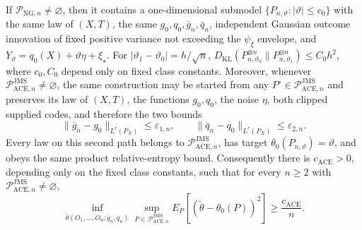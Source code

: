 If \(\mathcal P_{\mathrm{NG},n}\neq\varnothing\), then it contains a one-dimensional submodel \(\{P_{n,\vartheta}:|\vartheta|\le c_0\}\) with the same law of \((X,T)\), the same \(g_0,q_0,\bar g_n,\bar q_n\), independent Gaussian outcome innovation of fixed positive variance not exceeding the \(\psi_{\xi}\) envelope, and \(Y_{\vartheta}=q_0(X)+\vartheta\eta+\xi_{\star}\). For \(|\vartheta_1-\vartheta_0|=h/\sqrt n\), \(D_{\mathrm{KL}}(P_{n,\vartheta_0}^{\otimes n}\|P_{n,\vartheta_1}^{\otimes n})\le C_0h^2\), where \(c_0,C_0\) depend only on fixed class constants. Moreover, whenever \(\mathcal P_{\mathrm{ACE},n}^{\mathrm{JMS}}\neq\varnothing\), the same construction may be started from any \(P^{\circ}\in\mathcal P_{\mathrm{ACE},n}^{\mathrm{JMS}}\) and preserves its law of \((X,T)\), the functions \(g_0,q_0\), the noise \(\eta\), both clipped supplied codes, and therefore the two bounds
\[
 \|\bar g_n-g_0\|_{L^r(P_X)}\le\varepsilon_{1,n},
 \qquad
 \|\bar q_n-q_0\|_{L^r(P_X)}\le\varepsilon_{2,n}.
\]
Every law on this second path belongs to \(\mathcal P_{\mathrm{ACE},n}^{\mathrm{JMS}}\), has target \(\theta_0(P_{n,\vartheta})=\vartheta\), and obeys the same product relative-entropy bound. Consequently there is \(c_{\mathrm{ACE}}>0\), depending only on the fixed class constants, such that for every \(n\ge2\) with \(\mathcal P_{\mathrm{ACE},n}^{\mathrm{JMS}}\neq\varnothing\),
\[
 \inf_{\widetilde\theta(O_1,\ldots,O_n;\bar g_n,\bar q_n)}
 \sup_{P\in\mathcal P_{\mathrm{ACE},n}^{\mathrm{JMS}}}
 E_P[(\widetilde\theta-\theta_0(P))^2]
 \ge \frac{c_{\mathrm{ACE}}}{n}.
\]